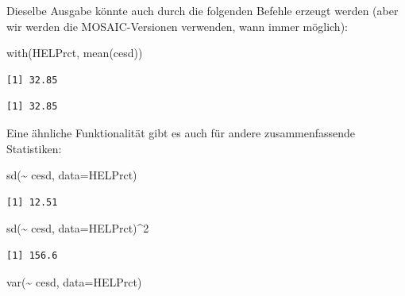 \documentclass[
  ngerman,
]{scrbook}
\newenvironment{Shaded}{\begin{snugshade}}{\end{snugshade}}
\newcommand{\AttributeTok}[1]{\textcolor[rgb]{0.77,0.63,0.00}{#1}}
\newcommand{\DecValTok}[1]{\textcolor[rgb]{0.00,0.00,0.81}{#1}}
\newcommand{\FunctionTok}[1]{\textcolor[rgb]{0.00,0.00,0.00}{#1}}
\newcommand{\NormalTok}[1]{#1}
\newcommand{\SpecialCharTok}[1]{\textcolor[rgb]{0.00,0.00,0.00}{#1}}
\begin{document}
Dieselbe Ausgabe könnte auch durch die folgenden Befehle erzeugt werden (aber wir werden die MOSAIC-Versionen verwenden, wann immer möglich):

\begin{Shaded}
\begin{Highlighting}[]
\FunctionTok{with}\NormalTok{(HELPrct, }\FunctionTok{mean}\NormalTok{(cesd))}
\end{Highlighting}
\end{Shaded}

\begin{verbatim}
[1] 32.85
\end{verbatim}

\begin{Shaded}
\end{Shaded}

\begin{verbatim}
[1] 32.85
\end{verbatim}

Eine ähnliche Funktionalität gibt es auch für andere zusammenfassende Statistiken:

\begin{Shaded}
\begin{Highlighting}[]
\FunctionTok{sd}\NormalTok{(}\SpecialCharTok{\textasciitilde{}}\NormalTok{ cesd, }\AttributeTok{data=}\NormalTok{HELPrct)}
\end{Highlighting}
\end{Shaded}

\begin{verbatim}
[1] 12.51
\end{verbatim}

\begin{Shaded}
\begin{Highlighting}[]
\FunctionTok{sd}\NormalTok{(}\SpecialCharTok{\textasciitilde{}}\NormalTok{ cesd, }\AttributeTok{data=}\NormalTok{HELPrct)}\SpecialCharTok{\^{}}\DecValTok{2}
\end{Highlighting}
\end{Shaded}

\begin{verbatim}
[1] 156.6
\end{verbatim}

\begin{Shaded}
\begin{Highlighting}[]
\FunctionTok{var}\NormalTok{(}\SpecialCharTok{\textasciitilde{}}\NormalTok{ cesd, }\AttributeTok{data=}\NormalTok{HELPrct)}
\end{Highlighting}
\end{Shaded}
\end{document}
